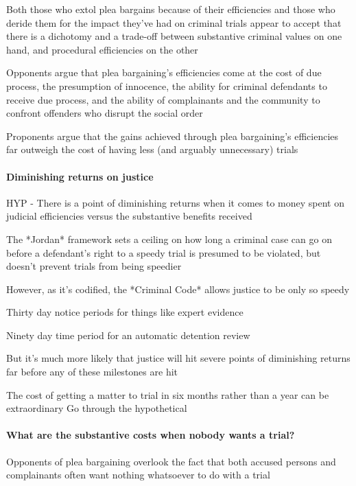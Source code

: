 Both those who extol plea bargains because of their efficiencies and those who deride them for the impact they've had on criminal trials appear to accept that there is a dichotomy and a trade-off between substantive criminal values on one hand, and procedural efficiencies on the other

Opponents argue that plea bargaining's efficiencies come at the cost of due process, the presumption of innocence, the ability for criminal defendants to receive due process, and the ability of complainants and the community to confront offenders who disrupt the social order

Proponents argue that the gains achieved through plea bargaining's efficiencies far outweigh the cost of having less (and arguably unnecessary) trials

\paragraph{Diminishing returns on justice}

HYP - There is a point of diminishing returns when it comes to money spent on judicial efficiencies versus the substantive benefits received

The *Jordan* framework sets a ceiling on how long a criminal case can go on before a defendant's right to a speedy trial is presumed to be violated, but doesn't prevent trials from being speedier

However, as it's codified, the *Criminal Code* allows justice to be only so speedy

Thirty day notice periods for things like expert evidence

Ninety day time period for an automatic detention review

But it's much more likely that justice will hit severe points of diminishing returns far before any of these milestones are hit

The cost of getting a matter to trial in six months rather than a year can be extraordinary
Go through the hypothetical

\paragraph{What are the substantive costs when nobody wants a trial?}

Opponents of plea bargaining overlook the fact that both accused persons and complainants often want nothing whatsoever to do with a trial

